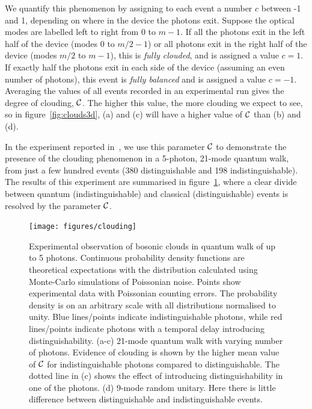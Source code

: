 We quantify this phenomenon by assigning to each event a number \(c\) between
-1 and 1, depending on where in the device the photons exit. Suppose the optical
modes are labelled left to right from 0 to \(m-1\). If all the photons exit
in the left half of the device (modes 0 to \(m/2-1\)) or all photons exit in the
right half of the device (modes \(m/2\) to \(m-1\)), this is \emph{fully
clouded}, and is assigned a value \(c=1\). If exactly half the photons exit in
each side of the device (assuming an even number of photons), this event is
\emph{fully balanced} and is assigned a value \(c=-1\). Averaging the values of
all events recorded in an experimental run gives the degree of clouding,
\(\mathcal{C}\). The higher this value, the more clouding we expect to see, so in
figure~\ref{fig:clouds3d}, (a) and (c) will have a higher value of \(\mathcal{C}\)
than (b) and (d).

In the experiment reported in~\cite{verification}, we use this parameter
\(\mathcal{C}\) to demonstrate the presence of the clouding phenomenon in a
5-photon, 21-mode quantum walk, from just a few hundred events (380
distinguishable and 198 indistinguishable). The results of this experiment are
summarised in figure~\ref{fig:clouding}, where a clear divide between quantum
(indistinguishable) and classical (distinguishable) events is resolved by
the parameter \(\mathcal{C}\).

\begin{figure}[h]
  \centering
  \texttt{[image: figures/clouding]}
  \caption[Experimental observation of bosonic clouds in quantum walks of up to
  5 photons]
  {Experimental observation of bosonic clouds in quantum walk of up to 5
  photons. Continuous probability density functions are theoretical expectations
  with the distribution calculated using Monte-Carlo simulations of Poissonian
  noise. Points show experimental data with Poissonian counting errors. The
  probability density is on an arbitrary scale with all distributions normalised
  to unity. Blue lines/points indicate indistinguishable photons, while red
  lines/points indicate photons with a temporal delay introducing
  distinguishability. (a-c) 21-mode quantum walk with varying number of photons.
  Evidence of clouding is shown by the higher mean value of \(\mathcal{C}\) for
  indistinguishable photons compared to distinguishable.
  The dotted line in (c) shows the effect of introducing distinguishability
  in one of the photons. (d) 9-mode random unitary. Here there is little
  difference between distinguishable and indistinguishable events.}
  \label{fig:clouding}
\end{figure}

